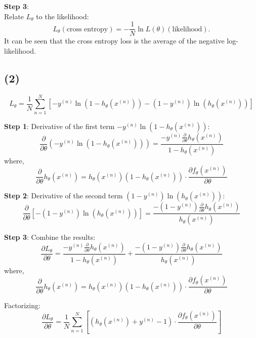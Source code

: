 \documentclass[onecolumn,oneside]{SUSTechHomework}
\begin{document}
    \textbf{Step 3}: \\
    Relate \( L_\theta \) to the likelihood:
    \[
        L_\theta (\text{cross entropy}) = -\frac{1}{N} \ln L(\theta)(\text{likelihood}).
    \]
    It can be seen that the cross entropy loss is the average of the negative log-likelihood.

    \subsection*{(2)}
    \[
    L_\theta = \frac{1}{N} \sum_{n=1}^N \left[ -y^{(n)} \ln \left(1 - h_\theta\left(x^{(n)}\right)\right) - \left(1 - y^{(n)}\right) \ln \left(h_\theta\left(x^{(n)}\right)\right) \right]
    \]

    \textbf{Step 1}: Derivative of the  first term \( -y^{(n)} \ln \left(1 - h_\theta\left(x^{(n)}\right)\right) \):
    \[
    \frac{\partial}{\partial \theta} \left( -y^{(n)} \ln \left(1 - h_\theta\left(x^{(n)}\right)\right) \right) = 
    \frac{-y^{(n)} \frac{\partial}{\partial \theta }h_\theta\left(x^{(n)}\right)}{1 - h_\theta\left(x^{(n)}\right)}
    \]
    where,
    \[
        \frac{\partial}{\partial \theta }h_\theta\left(x^{(n)}\right) = h_\theta\left(x^{(n)}\right) \left(1 - h_\theta\left(x^{(n)}\right)\right) \cdot \frac{\partial f_\theta\left(x^{(n)}\right)}{\partial \theta}
    \]

    \textbf{Step 2}: Derivative of the second term \( (1 - y^{(n)}) \ln (h_\theta(x^{(n)})) \):
    \[
    \frac{\partial}{\partial \theta} \left[ - (1 - y^{(n)}) \ln (h_\theta(x^{(n)})) \right] =
    \frac{- (1 - y^{(n)}) \frac{\partial}{\partial \theta }h_\theta\left(x^{(n)}\right)}{h_\theta\left(x^{(n)}\right)}
    \]

    \textbf{Step 3}: Combine the results:
    \[
    \frac{\partial L_\theta}{\partial \theta} = 
    \frac{-y^{(n)} \frac{\partial}{\partial \theta }h_\theta\left(x^{(n)}\right)}{1 - h_\theta\left(x^{(n)}\right)}
    + \frac{- (1 - y^{(n)}) \frac{\partial}{\partial \theta }h_\theta\left(x^{(n)}\right)}{h_\theta\left(x^{(n)}\right)}
    \]
    where,
    \[
        \frac{\partial}{\partial \theta }h_\theta\left(x^{(n)}\right) = h_\theta\left(x^{(n)}\right) \left(1 - h_\theta\left(x^{(n)}\right)\right) \cdot \frac{\partial f_\theta\left(x^{(n)}\right)}{\partial \theta}
    \]

    Factorizing:
    \[
    \frac{\partial L_\theta}{\partial \theta} = 
    \frac{1}{N} \sum_{n=1}^N \left[ \left(h_\theta\left(x^{(n)}\right) + y^{(n)} - 1\right) \cdot \frac{\partial f_\theta\left(x^{(n)}\right)}{\partial \theta} \right]
    \]
\end{document}
